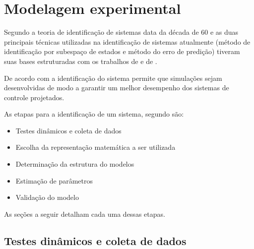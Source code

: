 
\chapter{Modelagem experimental}
\label{ch:modelagem_experimental}

Segundo  a teoria de identificação de sistemas data da década de 60 e as duas
principais técnicas utilizadas na identificação de sistemas atualmente (método de identificação por
subespaço de estados e método do erro de predição) tiveram suas bases estruturadas com os trabalhos
de  e de .

De acordo com  a identificação do sistema permite que simulações
sejam desenvolvidas de modo a garantir um melhor desempenho dos sistemas de controle projetados.

As etapas para a identificação de um sistema, segundo  são:
\begin{itemize}
    \item Testes dinâmicos e coleta de dados
    \item Escolha da representação matemática a ser utilizada
    \item Determinação da estrutura do modelos
    \item Estimação de parâmetros
    \item Validação do modelo
\end{itemize}

As seções a seguir detalham cada uma dessas etapas.

\section{Testes dinâmicos e coleta de dados}
\label{sec:testes_dinamicos_e_coleta_de_dados}


